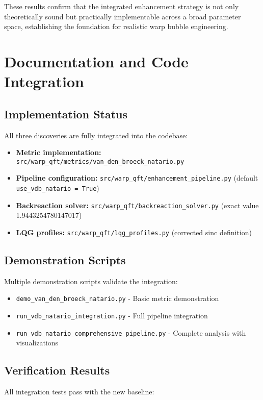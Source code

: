 \documentclass[11pt]{article}
\begin{document}
These results confirm that the integrated enhancement strategy is not only theoretically sound but practically implementable across a broad parameter space, establishing the foundation for realistic warp bubble engineering.

\section{Documentation and Code Integration}

\subsection{Implementation Status}
All three discoveries are fully integrated into the codebase:

\begin{itemize}
\item \textbf{Metric implementation:} \texttt{src/warp\_qft/metrics/van\_den\_broeck\_natario.py}
\item \textbf{Pipeline configuration:} \texttt{src/warp\_qft/enhancement\_pipeline.py} (default \texttt{use\_vdb\_natario = True})
\item \textbf{Backreaction solver:} \texttt{src/warp\_qft/backreaction\_solver.py} (exact value 1.9443254780147017)
\item \textbf{LQG profiles:} \texttt{src/warp\_qft/lqg\_profiles.py} (corrected sinc definition)
\end{itemize}

\subsection{Demonstration Scripts}
Multiple demonstration scripts validate the integration:

\begin{itemize}
\item \texttt{demo\_van\_den\_broeck\_natario.py} - Basic metric demonstration
\item \texttt{run\_vdb\_natario\_integration.py} - Full pipeline integration
\item \texttt{run\_vdb\_natario\_comprehensive\_pipeline.py} - Complete analysis with visualizations
\end{itemize}

\subsection{Verification Results}
All integration tests pass with the new baseline:
\end{document}
